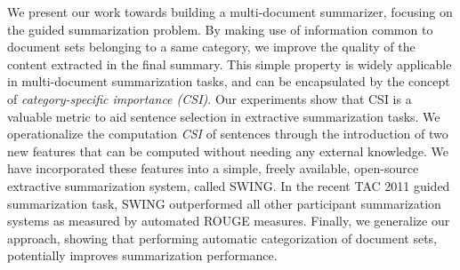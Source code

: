 We present our work towards building a multi-document summarizer, focusing on the guided summarization problem.  By making use of information common to document sets belonging to a same category, we improve the quality of the content extracted in the final summary. This simple property is widely applicable in multi-document summarization tasks, and can be encapsulated by the concept of \emph{category-specific importance (CSI)}.  Our experiments show that CSI is a valuable metric to aid sentence selection in extractive summarization tasks. We operationalize the computation \emph{CSI} of sentences through the introduction of two new features that can be computed without needing any external knowledge.  We have incorporated these features into a simple, freely available, open-source extractive summarization system, called SWING.  In the recent TAC 2011 guided summarization task, SWING outperformed all other participant summarization systems as measured by automated ROUGE measures. 
Finally, we generalize our approach, showing that performing automatic categorization of document sets, potentially improves summarization performance. 

